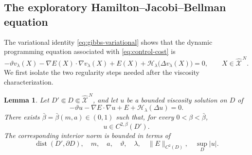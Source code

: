 \documentclass[11pt]{article}
\def\Xc{{\mathcal X}}
\def\hX{\widehat{\Xc}^{\,N}}
\newtheorem{lemma}[theorem]{Lemma}
\theoremstyle{definition}
\theoremstyle{remark}
\numberwithin{equation}{section}
\begin{document}
\subsection{The exploratory Hamilton--Jacobi--Bellman equation}\label{subsec:HJB}
The variational identity \eqref{eq:gibbs-variational} shows that the dynamic programming equation
associated with \eqref{eq:control-cost} is
\begin{equation}\label{eq:exploratory-HJB}
 -\vartheta v_\lambda(X)
 -\nabla E(X)\cdot\nabla v_\lambda(X)
 +E(X)
 +\mathscr H_\lambda\bigl(\Delta v_\lambda(X)\bigr)=0,
 \qquad X\in\hX.
\end{equation}
We first isolate the two regularity steps needed after the viscosity characterization.
\begin{lemma}\label{lem:HJB-interior-regularity}
Let $D'\Subset D\Subset\hX$, and let $u$ be a bounded viscosity solution on $D$ of
\[
 -\vartheta u-\nabla E\cdot\nabla u+E+\mathscr H_\lambda(\Delta u)=0.
\]
There exists
$\bar\beta=\bar\beta(m,a)\in(0,1)$ such that, for every
$0<\beta<\bar\beta$,
\[
 u\in C^{2,\beta}(D').
\]
The corresponding interior norm is bounded in terms of
\[
 \operatorname{dist}(D',\partial D),\quad m,\quad a,\quad
 \vartheta,\quad\lambda,\quad
 \|E\|_{C^2(D)},\quad\sup_D|u|.
\]
\end{lemma}
\end{document}

